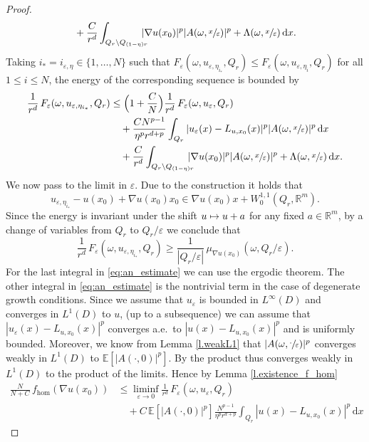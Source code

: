 \documentclass[10pt]{amsart}
\def\mto{\mathchoice{\longmapsto}{\mapsto}{\mapsto}{\mapsto}}
\theoremstyle{definition}
\let\e\varepsilon
\let\w\omega
\newcommand{\dx}{\,\mathrm{d}x}
\newcommand{\R}{\mathbb{R}}
\begin{document}
\begin{proof}
\begin{align*}
&\quad+\frac{C}{r^d}\int_{Q_r\setminus Q_{(1-\eta)r}}\hspace*{-3mm}|\nabla u(x_0)|^p|A(\w,\sfrac{x}{\e})|^p+\Lambda(\w,\sfrac{x}{\e})\dx.
\end{align*}
Taking $i_*=i_{\e,\eta}\in\{1,\ldots,N\}$ such that $F_{\e}(\w,u_{\e,\eta_{i_*}},Q_r)\leq F_{\e}(\w,u_{\e,\eta_i},Q_r)$ for all $1\leq i\leq N$, the energy of the corresponding sequence is bounded by
\begin{align}\label{eq:an_estimate}
\frac{1}{r^d}\,F_{\e}(\w,u_{\e,\eta_{i_*}},Q_r)&\leq \Bigl(1+\frac{C}{N}\Bigr)\frac{1}{r^d}\,F_{\e}(\w,u_{\e},Q_r)
\\
&\quad +\frac{CN^{p-1}}{\eta^p r^{d+p}}\int_{Q_r}|u_{\e}(x)-L_{u,x_0}(x)|^p|A(\w,\sfrac{x}{\e})|^p\dx\nonumber
\\
&\quad + \frac{C}{r^d}\int_{Q_r\setminus Q_{(1-\eta)r}}\hspace*{-3mm}|\nabla u(x_0)|^p|A(\w,\sfrac{x}{\e})|^p+\Lambda(\w,\sfrac{x}{\e})\dx. \nonumber
\end{align}
We now pass to the limit in $\e$. Due to the construction it holds that
\[
u_{\e,\eta_{i_*}}-u(x_0)+\nabla u(x_0)x_0\in \nabla u(x_0)x+W^{1,1}_0(Q_r,\R^m).
\]
Since the energy is invariant under the shift $u\mto u+a$ for any fixed $a\in\R^m$, by a change of variables from $Q_r$ to $Q_r/\e$ we conclude that
\begin{equation*}
\frac{1}{r^d}\,F_{\e}(\w,u_{\e,\eta_{i_*}},Q_r)\geq \frac{1}{|Q_r/\e|}\,\mu_{\nabla u(x_0)}(\w,Q_r/\e).
\end{equation*}
For the last integral in \eqref{eq:an_estimate} we can use the ergodic theorem. The other integral in \eqref{eq:an_estimate} is the nontrivial term in the case of degenerate growth conditions. Since we assume that $u_{\e}$ is bounded in $L^{\infty}(D)$ and converges in $L^1(D)$ to $u$, (up to a subsequence) we can assume that $|u_{\e}(x)-L_{u,x_0}(x)|^p$ converges a.e.\ to $|u(x)-L_{u,x_0}(x)|^p$ and is uniformly bounded. Moreover, we know from Lemma \ref{l.weakL1} that $|A(\w,\sfrac{\cdot}{\e})|^p$ converges weakly in $L^1(D)$ to $\mathbb{E}[|A(\cdot,0)|^p]$. By \cite[Prop.\,2.61]{FoLe} the product thus converges weakly in $L^1(D)$ to the product of the limits. Hence by Lemma \ref{l.existence_f_hom}
\begin{align*}
\frac{N}{N+C}\,f_{\hom}(\nabla u(x_0))&\leq \liminf_{\e\to 0}\frac{1}{r^d}\,F_{\e}(\w,u_{\e},Q_r)\nonumber
\\
&\quad +C\,\mathbb{E}[|A(\cdot,0)|^p]\frac{N^{p-1}}{\eta^p r^{d+p}}\int_{Q_r}|u(x)-L_{u,x_0}(x)|^p\dx

\end{align*}
\end{proof}
\end{document}

